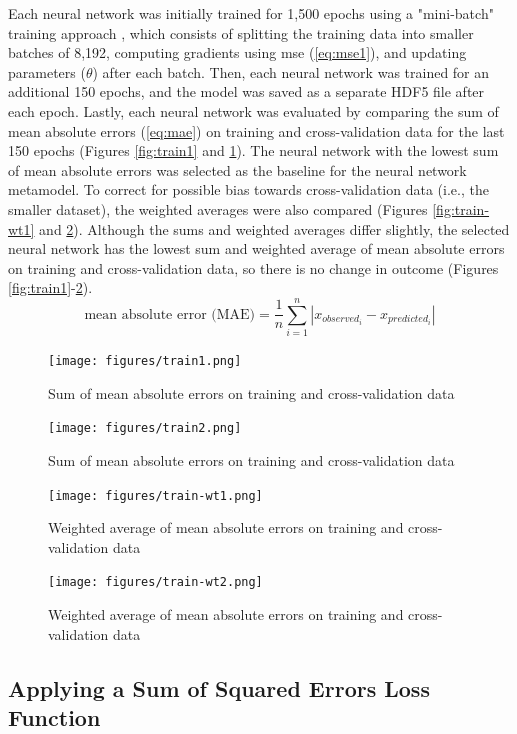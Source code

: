 Each neural network was initially trained for 1,500 epochs using a "mini-batch" training approach \cite{goodfellow}, which consists of splitting the training data into smaller batches of 8,192, computing gradients using \gls{mse} (\ref{eq:mse1}), and updating parameters ($\theta$) after each batch.
Then, each neural network was trained for an additional 150 epochs, and the model was saved as a separate HDF5 file after each epoch.
Lastly, each neural network was evaluated by comparing the sum of mean absolute errors (\ref{eq:mae}) on training and cross-validation data for the last 150 epochs (Figures \ref{fig:train1} and \ref{fig:train2}).
The neural network with the lowest sum of mean absolute errors was selected as the baseline for the neural network metamodel.
To correct for possible bias towards cross-validation data (i.e., the smaller dataset), the weighted averages were also compared (Figures \ref{fig:train-wt1} and \ref{fig:train-wt2}).
Although the sums and weighted averages differ slightly, the selected neural network has the lowest sum and weighted average of mean absolute errors on training and cross-validation data, so there is no change in outcome (Figures \ref{fig:train1}-\ref{fig:train-wt2}).
%
\begin{equation}
  \label{eq:mae}
  \mbox{mean absolute error (MAE)} = \frac{1}{n} \sum_{i = 1}^{n} | x_{observed_{i}} - x_{predicted_{i}} |
\end{equation}

\begin{figure}
  \centering
  \texttt{[image: figures/train1.png]}
  \caption{Sum of mean absolute errors on training and cross-validation data}
  \label{fig:train1}
  \vspace{+1.1cm}
  \texttt{[image: figures/train2.png]}
  \caption{Sum of mean absolute errors on training and cross-validation data}
  \label{fig:train2}
\end{figure}

\begin{figure}
  \centering
  \texttt{[image: figures/train-wt1.png]}
  \caption{Weighted average of mean absolute errors on training and cross-validation data}
  \label{fig:train-wt1}
  \vspace{+1.1cm}
  \texttt{[image: figures/train-wt2.png]}
  \caption{Weighted average of mean absolute errors on training and cross-validation data}
  \label{fig:train-wt2}
\end{figure}

\subsection{Applying a Sum of Squared Errors Loss Function}

